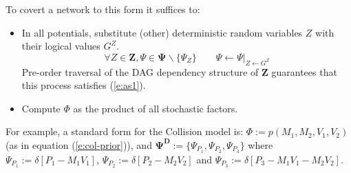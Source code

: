 \documentclass{article}
\newcommand{\bvec}[1]{\textbf{#1}}
\newcommand{\pr}{p}
\begin{document}


To covert a network to this form it suffices to: 
 \begin{itemize}
\item In all potentials, substitute (other) deterministic random variables $Z$ with their logical values $G^Z$. 
\begin{equation*}
\forall Z \in \bvec{Z}, \Psi \in \boldsymbol{\Psi}\backslash \{\Psi_Z\} \qquad \Psi \leftarrow \Psi|_{Z \leftarrow G^Z}
\end{equation*}
Pre-order traversal of the DAG dependency structure of $\bvec{Z}$ guarantees that this process satisfies (\ref{e:as1}).  
\item Compute $\Phi$ as the product of all stochastic factors.
\end{itemize} %

For example, a standard form for the Collision model is:
$\Phi := \pr(M_1, M_2, V_1, V_2)$ (as in equation (\ref{e:col-prior})),
and $\boldsymbol{\Psi^D} := \{\Psi_{P_1}, \Psi_{P_2}, \Psi_{P_3}\}$ 
where $\Psi_{P_1} := \delta[P_1 - M_1 V_1]$,
$\Psi_{P_2} := \delta[P_2 - M_2 V_2]$ and
$\Psi_{P_3} := \delta[P_3 - M_1 V_1 - M_2 V_2]$.
\end{document}
